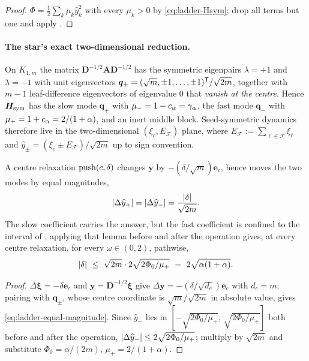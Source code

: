\begin{proof}
$\Phi=\tfrac12\sum_{k}\mu_{k}\widehat y_{k}^{2}$ with every $\mu_{k}>0$ by
\eqref{eq:ladder-Hsym}; drop all terms but one and apply
.
\end{proof}

\paragraph{The star's exact two-dimensional reduction.}
On $K_{1,m}$ the matrix $\bm{D}^{-1/2}\bm{A}\bm{D}^{-1/2}$ has the symmetric eigenpairs
$\lambda=+1$ and $\lambda=-1$ with unit eigenvectors
$\bm{q}_{\pm}=(\sqrt m,\pm1,\ldots,\pm1)^{\mathsf{T}}/\sqrt{2m}$, together with $m-1$
leaf-difference eigenvectors of eigenvalue $0$ that \emph{vanish at the
centre}. Hence $\bm{H}_{\mathrm{sym}}$ has the slow mode $\bm{q}_{+}$ with
$\mu_{-}=1-c_{\alpha}=\gamma_{\alpha}$, the fast mode $\bm{q}_{-}$ with
$\mu_{+}=1+c_{\alpha}=2/(1+\alpha)$, and an inert middle block. Seed-symmetric
dynamics therefore live in the two-dimensional
$(\xi_{c},E_{\mathcal F})$ plane, where
$E_{\mathcal F}:=\sum_{\ell\in\mathcal F}\xi_{\ell}$ and
$\widehat y_{\pm}=(\xi_{c}\pm E_{\mathcal F})/\sqrt{2m}$ up to sign convention.

\begin{lemma}
\label{lem:ladder-displacement}
A centre relaxation $\operatorname{push}(c,\delta)$ changes $\bm{y}$ by
$-(\delta/\sqrt m)\bm{e}_{c}$, hence moves the two modes by equal magnitudes,
\begin{equation}
    \left\lvert \Delta\widehat y_{+} \right\rvert=\left\lvert \Delta\widehat y_{-} \right\rvert
    =\frac{\left\lvert \delta \right\rvert}{\sqrt{2m}} .
    \label{eq:ladder-equal-magnitude}
\end{equation}
The slow coefficient carries the answer, but the fast coefficient is confined
to the interval of ; applying that lemma before and
after the operation gives, at every centre relaxation, for every
$\omega\in(0,2)$, pathwise,
\begin{equation}
    \abs{\delta}\ \le\ \sqrt{2m}\cdot2\sqrt{2\Phi_{0}/\mu_{+}}
    \ =\ 2\sqrt{\alpha(1+\alpha)} .
    \label{eq:ladder-displacement-cap}
\end{equation}
\end{lemma}

\begin{proof}
$\Delta\bm{\xi}=-\delta\bm{e}_{c}$ and
$\bm{y}=\bm{D}^{-1/2}\bm{\xi}$ give
$\Delta\bm{y}=-(\delta/\sqrt{d_{c}})\bm{e}_{c}$ with $d_{c}=m$; pairing with
$\bm{q}_{\pm}$, whose centre coordinate is $\sqrt m/\sqrt{2m}$ in absolute value,
gives \eqref{eq:ladder-equal-magnitude}. Since $\widehat y_{-}$ lies in
$[-\sqrt{2\Phi_{0}/\mu_{+}},\,\sqrt{2\Phi_{0}/\mu_{+}}]$ both before and after
the operation, $\left\lvert \Delta\widehat y_{-} \right\rvert\le2\sqrt{2\Phi_{0}/\mu_{+}}$;
multiply by $\sqrt{2m}$ and substitute $\Phi_{0}=\alpha/(2m)$,
$\mu_{+}=2/(1+\alpha)$.
\end{proof}

